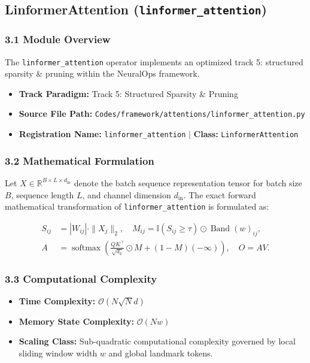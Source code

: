 \subsection{LinformerAttention (\texttt{linformer\_attention})}
\label{sec:app_module_linformer\_attention}

\subsubsection*{3.1 Module Overview}
The \texttt{linformer\_attention} operator implements an optimized track 5: structured sparsity \& pruning within the NeuralOps framework.
\begin{itemize}
    \item \textbf{Track Paradigm:} Track 5: Structured Sparsity & Pruning
    \item \textbf{Source File Path:} \texttt{Codes/framework/attentions/linformer\_attention.py}
    \item \textbf{Registration Name:} \texttt{linformer\_attention} $\mid$ \textbf{Class:} \texttt{LinformerAttention}
\end{itemize}

\subsubsection*{3.2 Mathematical Formulation}
Let $X \in \mathbb{R}^{B \times L \times d_{\text{in}}}$ denote the batch sequence representation tensor for batch size $B$, sequence length $L$, and channel dimension $d_{\text{in}}$. The exact forward mathematical transformation of \texttt{linformer\_attention} is formulated as:

\begin{align}
S_{ij} &= |W_{ij}| \cdot \|X_j\|_2, \quad M_{ij} = \mathbb{I}(S_{ij} \ge \tau) \odot \operatorname{Band}(w)_{ij}, \\
A &= \operatorname{softmax}\left(\frac{Q K^\top}{\sqrt{d_k}} \odot M + (1 - M)(-\infty)\right), \quad O = A V.
\end{align}


\subsubsection*{3.3 Computational Complexity}
\begin{itemize}
    \item \textbf{Time Complexity:} $\mathcal{O}(N \sqrt{N} d)$
    \item \textbf{Memory State Complexity:} $\mathcal{O}(N w)$
    \item \textbf{Scaling Class:} Sub-quadratic computational complexity governed by local sliding window width $w$ and global landmark tokens.
\end{itemize}


